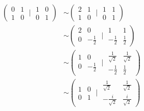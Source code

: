 \begin{equation}
    \begin{split}
        \left(\begin{matrix}0&1\\1&0\end{matrix}\;\Biggl|\;\begin{matrix}1&0\\0&1\end{matrix}\right)&\sim
        \left(\begin{matrix}2&1\\1&0\end{matrix}\;\Biggl|\;\begin{matrix}1&1\\0&1\end{matrix}\right)\\
&\sim \left(\begin{matrix}2&0\\0&-\tfrac{1}{2}\end{matrix}\;\Biggl|\;\begin{matrix}1&1\\-\tfrac{1}{2}&\tfrac{1}{2}\end{matrix}\right)\\
&\sim \left(\begin{matrix}1&0\\0&-\tfrac{1}{2}\end{matrix}\;\Biggl|\;\begin{matrix}\tfrac{1}{\sqrt{2}}&\tfrac{1}{\sqrt{2}}\\-\tfrac{1}{2}&\tfrac{1}{2}\end{matrix}\right)\\
&\sim \left(\begin{matrix}1&0\\0&1\end{matrix}\;\Biggl|\;\begin{matrix}\tfrac{1}{\sqrt{2}}&\tfrac{1}{\sqrt{2}}\\-\tfrac{i}{\sqrt{2}}&\tfrac{i}{\sqrt{2}}\end{matrix}\right)
    \end{split}
\end{equation}

